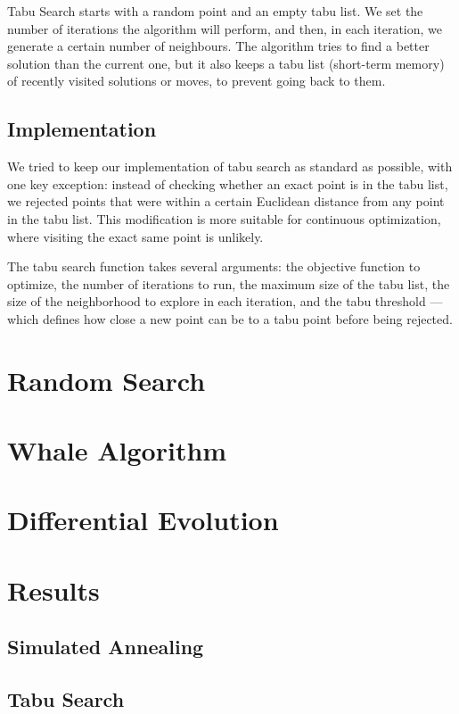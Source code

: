 \documentclass{report}
\begin{document}
Tabu Search starts with a random point and an empty tabu list. We set the number of iterations the algorithm will perform, and then, in each iteration, we generate a certain number of neighbours. The algorithm tries to find a better solution than the current one, but it also keeps a tabu list (short-term memory) of recently visited solutions or moves, to prevent going back to them.

\subsection*{Implementation}

We tried to keep our implementation of tabu search as standard as possible, with one key exception: instead of checking whether an exact point is in the tabu list, we rejected points that were within a certain Euclidean distance from any point in the tabu list. This modification is more suitable for continuous optimization, where visiting the exact same point is unlikely.

The tabu search function takes several arguments: the objective function to optimize, the number of iterations to run, the maximum size of the tabu list, the size of the neighborhood to explore in each iteration, and the tabu threshold — which defines how close a new point can be to a tabu point before being rejected.

\section*{Random Search}

\section*{Whale Algorithm}

\section*{Differential Evolution}

\section*{Results}

\subsection*{Simulated Annealing}
\subsection*{Tabu Search}
\end{document}
